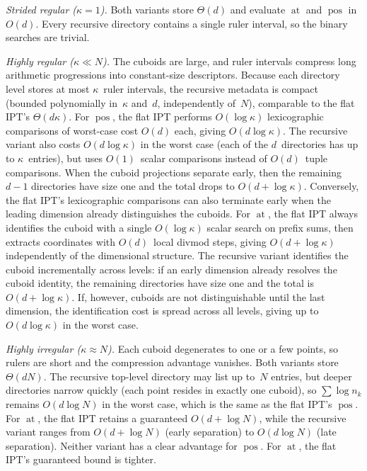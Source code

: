 \documentclass[manuscript,screen,review]{acmart}
\theoremstyle{definition}
\theoremstyle{plain}
\begin{document}
\emph{Strided regular ($\kappa=1$).}
Both variants store $\Theta(d)$ and evaluate $\operatorname{at}$ and $\operatorname{pos}$
in~$O(d)$.
Every recursive directory contains a single ruler interval,
so the binary searches are trivial.

\emph{Highly regular ($\kappa\ll N$).}
The cuboids are large, and ruler intervals compress long arithmetic
progressions into constant-size descriptors.
Because each directory level stores at most $\kappa$~ruler intervals,
the recursive metadata is compact (bounded polynomially
in~$\kappa$ and~$d$, independently of~$N$), comparable
to the flat IPT's $\Theta(d\kappa)$.
For $\operatorname{pos}$, the flat IPT performs $O(\log\kappa)$ lexicographic
comparisons of worst-case cost $O(d)$ each, giving $O(d\log\kappa)$.
The recursive variant also costs $O(d\log\kappa)$ in the worst case
(each of the $d$~directories has up to $\kappa$~entries),
but uses $O(1)$~scalar comparisons instead of $O(d)$~tuple comparisons.
When the cuboid projections separate early, then the remaining $d{-}1$ directories
have size one and the total drops to $O(d+\log\kappa)$.
Conversely, the flat IPT's lexicographic comparisons can also
terminate early when the leading dimension already distinguishes
the cuboids.
For $\operatorname{at}$, the flat IPT always identifies the cuboid with
a single $O(\log\kappa)$ scalar search on prefix sums,
then extracts coordinates with $O(d)$~local divmod steps,
giving $O(d+\log\kappa)$ independently of the dimensional structure.
The recursive variant identifies the cuboid incrementally
across levels:
if an early dimension already resolves the cuboid identity,
the remaining directories have size one and the total is
$O(d+\log\kappa)$.
If, however, cuboids are not distinguishable until the last
dimension, the identification cost is spread across all levels,
giving up to $O(d\log\kappa)$ in the worst case.

\emph{Highly irregular ($\kappa\approx N$).}
Each cuboid degenerates to one or a few points, so rulers are short
and the compression advantage vanishes.
Both variants store $\Theta(dN)$.
The recursive top-level directory may list up to~$N$ entries, but deeper directories narrow quickly
(each point resides in exactly one cuboid),
so $\sum\log n_k$ remains $O(d\log N)$ in the worst case, which is the
same as the flat IPT's $\operatorname{pos}$.
For $\operatorname{at}$, the flat IPT retains a guaranteed $O(d+\log N)$,
while the recursive variant ranges from $O(d+\log N)$
(early separation) to $O(d\log N)$ (late separation).
Neither variant has a clear advantage for $\operatorname{pos}$.
For $\operatorname{at}$, the flat IPT's guaranteed bound is tighter.
\end{document}
